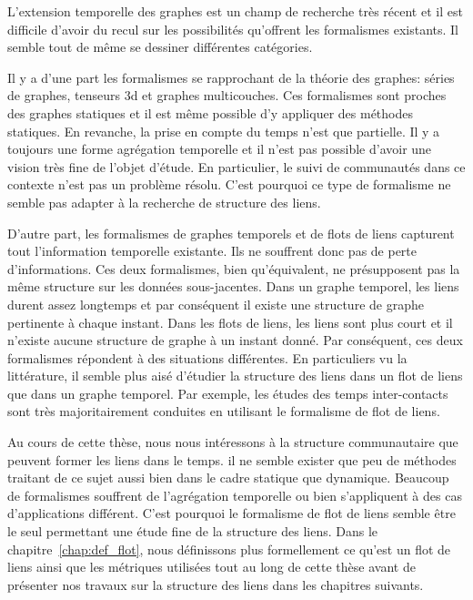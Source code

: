 L'extension temporelle des graphes est un champ de recherche très récent et il est difficile d'avoir du recul sur les possibilités qu'offrent les formalismes existants.
Il semble tout de même se dessiner différentes catégories.

Il y a d'une part les formalismes se rapprochant de la théorie des graphes: séries de graphes, tenseurs 3d et graphes multicouches.
Ces formalismes sont proches des graphes statiques et il est même possible d'y appliquer des méthodes statiques.
En revanche, la prise en compte du temps n'est que partielle.
Il y a toujours une forme agrégation temporelle et il n'est pas possible d'avoir une vision très fine de l'objet d'étude.
En particulier, le suivi de communautés dans ce contexte n'est pas un problème résolu.
C'est pourquoi ce type de formalisme ne semble pas adapter à la recherche de structure des liens.

D'autre part, les formalismes de graphes temporels et de flots de liens capturent tout l'information temporelle existante.
Ils ne souffrent donc pas de perte d'informations.
Ces deux formalismes, bien qu'équivalent, ne présupposent pas la même structure sur les données sous-jacentes.
Dans un graphe temporel, les liens durent assez longtemps et par conséquent il existe une structure de graphe pertinente à chaque instant.
Dans les flots de liens, les liens sont plus court et il n'existe aucune structure de graphe à un instant donné.
Par conséquent, ces deux formalismes répondent à des situations différentes.
En particuliers vu la littérature, il semble plus aisé d'étudier la structure des liens dans un flot de liens que dans un graphe temporel.
Par exemple, les études des temps inter-contacts sont très majoritairement conduites en utilisant le formalisme de flot de liens.


Au cours de cette thèse, nous nous intéressons à la structure communautaire que peuvent former les liens dans le temps.
il ne semble exister que peu de méthodes traitant de ce sujet aussi bien dans le 
cadre statique que dynamique.
Beaucoup de formalismes souffrent de l'agrégation temporelle ou bien s'appliquent à des cas d'applications différent.
C'est pourquoi le formalisme de flot de liens semble être le seul permettant une étude fine de la structure des liens.
Dans le chapitre~\ref{chap:def_flot}, nous définissons plus formellement ce qu'est un flot de liens ainsi que les métriques utilisées tout au long de cette thèse avant de présenter nos travaux sur la structure des liens dans les chapitres suivants.
